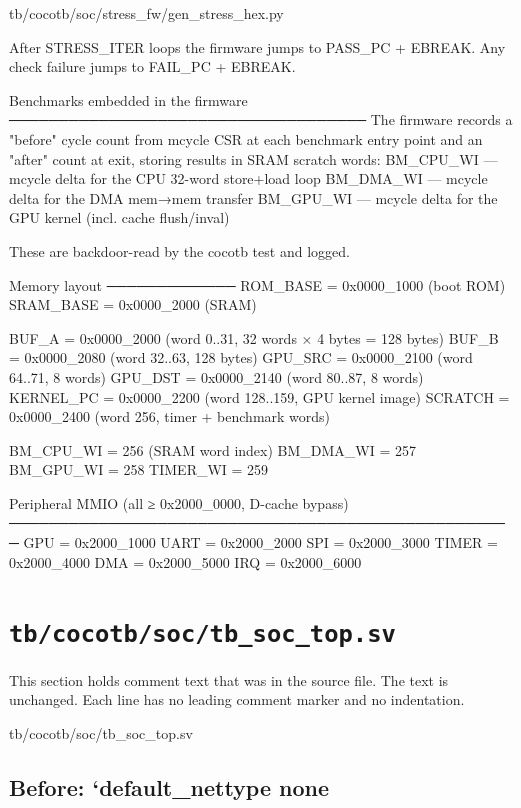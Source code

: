 \begin{relocated}{tb/cocotb/soc/stress_fw/gen_stress_hex.py}
\begin{textblock}
After STRESS_ITER loops the firmware jumps to PASS_PC + EBREAK.
Any check failure jumps to FAIL_PC + EBREAK.

Benchmarks embedded in the firmware
────────────────────────────────────
The firmware records a "before" cycle count from mcycle CSR at each benchmark entry
point and an "after" count at exit, storing results in SRAM scratch words:
BM_CPU_WI   — mcycle delta for the CPU 32-word store+load loop
BM_DMA_WI   — mcycle delta for the DMA mem→mem transfer
BM_GPU_WI   — mcycle delta for the GPU kernel (incl. cache flush/inval)

These are backdoor-read by the cocotb test and logged.

Memory layout
─────────────
ROM_BASE   = 0x0000_1000  (boot ROM)
SRAM_BASE  = 0x0000_2000  (SRAM)

BUF_A      = 0x0000_2000  (word 0..31, 32 words × 4 bytes = 128 bytes)
BUF_B      = 0x0000_2080  (word 32..63, 128 bytes)
GPU_SRC    = 0x0000_2100  (word 64..71, 8 words)
GPU_DST    = 0x0000_2140  (word 80..87, 8 words)
KERNEL_PC  = 0x0000_2200  (word 128..159, GPU kernel image)
SCRATCH    = 0x0000_2400  (word 256, timer + benchmark words)

BM_CPU_WI  = 256   (SRAM word index)
BM_DMA_WI  = 257
BM_GPU_WI  = 258
TIMER_WI   = 259

Peripheral MMIO (all ≥ 0x2000_0000, D-cache bypass)
───────────────────────────────────────────────────
GPU    = 0x2000_1000
UART   = 0x2000_2000
SPI    = 0x2000_3000
TIMER  = 0x2000_4000
DMA    = 0x2000_5000
IRQ    = 0x2000_6000
\end{textblock}

\end{relocated}

\section{\texttt{tb/cocotb/soc/tb\_soc\_top.sv}}\label{tm:suite:soc-tb-soc-top-sv}

This section holds comment text that was in the source file. The text is unchanged. Each line has no leading comment marker and no indentation.

\begin{relocated}{tb/cocotb/soc/tb_soc_top.sv}

\subsection*{Before: `default\_nettype none}


\end{relocated}

